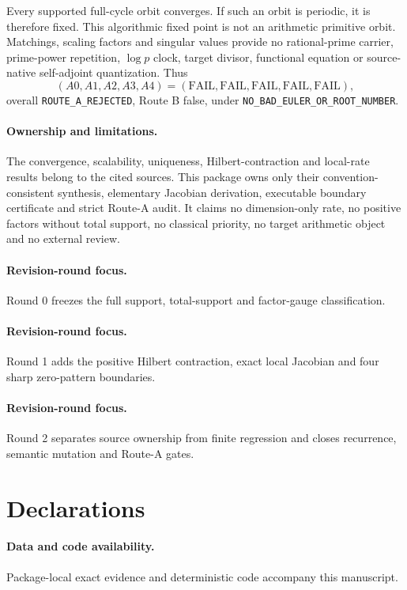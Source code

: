 \documentclass[9pt]{extarticle}
\begin{document}
Every supported full-cycle orbit converges.  If such an orbit is periodic, it
is therefore fixed.  This algorithmic fixed point is not an arithmetic
primitive orbit.  Matchings, scaling factors and singular values provide no
rational-prime carrier, prime-power repetition, $\log p$ clock, target divisor,
functional equation or source-native self-adjoint quantization.  Thus
\[
 (A0,A1,A2,A3,A4)=(\mathrm{FAIL},\mathrm{FAIL},\mathrm{FAIL},
 \mathrm{FAIL},\mathrm{FAIL}),
\]
overall \texttt{ROUTE\_A\_REJECTED}, Route B false, under
\texttt{NO\_BAD\_EULER\_OR\_ROOT\_NUMBER}.

\paragraph{Ownership and limitations.}
The convergence, scalability, uniqueness, Hilbert-contraction and local-rate
results belong to the cited sources.  This package owns only their
convention-consistent synthesis, elementary Jacobian derivation, executable
boundary certificate and strict Route-A audit.  It claims no dimension-only
rate, no positive factors without total support, no classical priority, no
target arithmetic object and no external review.

\ifcase\CRevisionRound
\paragraph{Revision-round focus.} Round 0 freezes the full support,
total-support and factor-gauge classification.
\or
\paragraph{Revision-round focus.} Round 1 adds the positive Hilbert
contraction, exact local Jacobian and four sharp zero-pattern boundaries.
\or
\paragraph{Revision-round focus.} Round 2 separates source ownership from
finite regression and closes recurrence, semantic mutation and Route-A gates.
\fi

\section*{Declarations}
\paragraph{Data and code availability.} Package-local exact evidence and
deterministic code accompany this manuscript.
\end{document}
